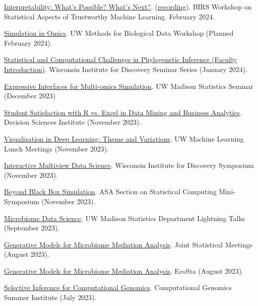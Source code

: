 \documentclass[letterpaper]{article}
\renewenvironment{itemize}{
  \begin{list}{}{
    \setlength{\leftmargin}{1.5em}
  }
}{
  \end{list}
}
\begin{document}
\begin{itemize}
  \item \href{https://krisrs1128.github.io/talks/2024/20240212/20240212.html}{Interpretability: What's Possible? What's Next?}. (\href{https://www.birs.ca/events/2024/5-day-workshops/24w5284/videos/watch/202402120904-Sankaran.html}{recording}). BIRS Workshop on Statistical Aspects of Trustworthy Machine Learning. February 2024.
  \item \href{https://github.com/krisrs1128/talks/blob/master/2024/20240207/20240207.Rmd}{Simulation in Omics}. UW Methods for Biological Data Workshop (Planned February 2024).
  \item \href{https://krisrs1128.github.io/talks/2024/20240131/20240131.html#1}{Statistical and Computational Challenges in Phylogenetic Inference (Faculty Introduction)}. Wisconsin Institute for Discovery Seminar Series (January 2024). 
  \item \href{https://go.wisc.edu/4y9176}{Expressive Interfaces for Multi-omics Simulation}. UW Madison Statistics Seminar (December 2023)
  \item \href{https://github.com/krisrs1128/talks/blob/master/2023/20231118/dsi-kris.pptx}{Student Satisfaction with R vs. Excel in Data Mining and Business Analytics}. Decision Sciences Institute (November 2023).
  \item \href{https://go.wisc.edu/9p83o9}{Visualization in Deep Learning: Theme and Variations}. UW Machine Learning Lunch Meetings (November 2023).
  \item \href{https://go.wisc.edu/02jao8}{Interactive Multiview Data Science}. Wisconsin Institute for Discovery Symposium (November 2023).
  \item \href{https://go.wisc.edu/fg7wr4}{Beyond Black Box Simulation}. ASA Section on Statistical Computing Mini-Symposium (November 2023).
  \item \href{https://go.wisc.edu/uhka79}{Microbiome Data Science}. UW Madison Statistics Department Lightning Talks (September 2023).
  \item \href{https://drive.google.com/file/d/1lQBb665vsyILnknqMdGZMPkj-7Nhhgqw/view?usp=drive_link}{Generative Models for Microbiome Mediation Analysis}. Joint Statistical Meetings (August 2023).
  \item \href{https://go.wisc.edu/77q6rs}{Generative Models for Microbiome Mediation Analysis}. EcoSta (August 2023).
  \item \href{https://go.wisc.edu/7l1k95}{Selective Inference for Computational Genomics}. Computational Genomics Summer Institute (July 2023).

\end{itemize}
\end{document}
